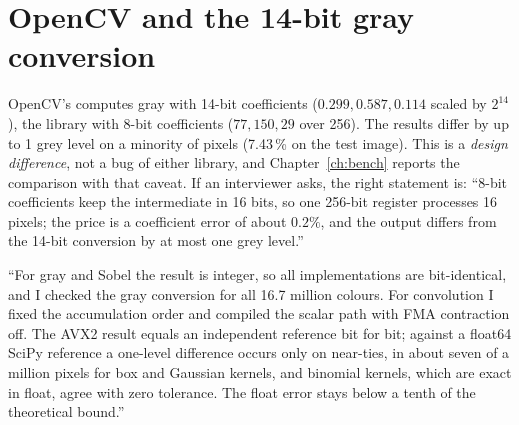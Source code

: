 \section{OpenCV and the 14-bit gray conversion}

OpenCV's  computes gray with 14-bit coefficients ($0.299,0.587,0.114$ scaled by $2^{14}$), the library with 8-bit coefficients ($77,150,29$ over 256). The results differ by up to 1 grey level on a minority of pixels (7.43\,\% on the test image). This is a \emph{design difference}, not a bug of either library, and Chapter~\ref{ch:bench} reports the comparison with that caveat. If an interviewer asks, the right statement is: ``8-bit coefficients keep the intermediate in 16 bits, so one 256-bit register processes 16 pixels; the price is a coefficient error of about $0.2\%$, and the output differs from the 14-bit conversion by at most one grey level.''

\begin{sound}
``For gray and Sobel the result is integer, so all implementations are bit-identical, and I checked the gray conversion for all 16.7 million colours. For convolution I fixed the accumulation order and compiled the scalar path with FMA contraction off. The AVX2 result equals an independent  reference bit for bit; against a float64 SciPy reference a one-level difference occurs only on near-ties, in about seven of a million pixels for box and Gaussian kernels, and binomial kernels, which are exact in float, agree with zero tolerance. The float error stays below a tenth of the theoretical bound.''
\end{sound}
